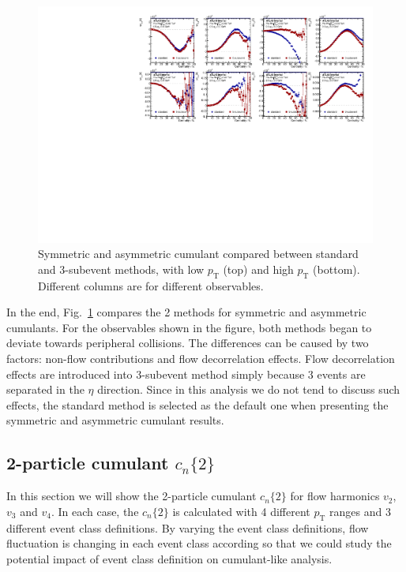 \begin{figure}[H]
\centering
\includegraphics[width=.95\linewidth]{figs/sec_result/forQM/mtd_sc.pdf}
\caption{Symmetric and asymmetric cumulant compared between standard and 3-subevent methods, with low $p_\text{T}$ (top) and high $p_\text{T}$ (bottom). Different columns are for different observables.}
\label{fig:result_mtd_sc}
\end{figure}
In the end, Fig.~\ref{fig:result_mtd_sc} compares the 2 methods for symmetric and asymmetric cumulants. For the observables shown in the figure, both methods began to deviate towards peripheral collisions. The differences can be caused by two factors: non-flow contributions and flow decorrelation effects. Flow decorrelation effects are introduced into 3-subevent method simply because 3 events are separated in the $\eta$ direction. Since in this analysis we do not tend to discuss such effects, the standard method is selected as the default one when presenting the symmetric and asymmetric cumulant results.

\subsection{2-particle cumulant $c_n\{2\}$}
In this section we will show the 2-particle cumulant $c_n\{2\}$ for flow harmonics $v_2$, $v_3$ and $v_4$. In each case, the $c_n\{2\}$ is calculated with 4 different $p_\text{T}$ ranges and 3 different event class definitions. By varying the event class definitions, flow fluctuation is changing in each event class according so that we could study the potential impact of event class definition on cumulant-like analysis.

